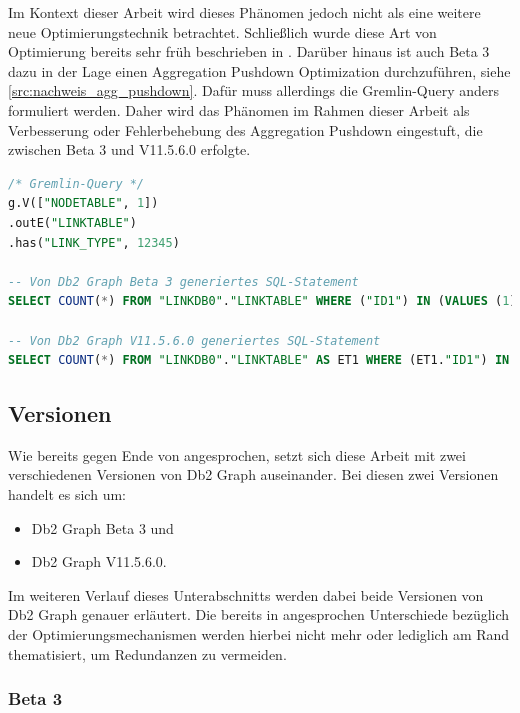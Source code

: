 \begin{itemize}
    Im Kontext dieser Arbeit wird dieses Phänomen jedoch nicht als eine weitere neue Optimierungstechnik betrachtet. Schließlich wurde diese Art von Optimierung bereits sehr früh beschrieben in \cite{sigmod_tian}. Darüber hinaus ist auch Beta 3 dazu in der Lage einen Aggregation Pushdown Optimization durchzuführen, siehe \autoref{src:nachweis_agg_pushdown}. Dafür muss allerdings die Gremlin-Query anders formuliert werden. Daher wird das Phänomen im Rahmen dieser Arbeit als Verbesserung oder Fehlerbehebung des Aggregation Pushdown eingestuft, die zwischen Beta 3 und V11.5.6.0 erfolgte.

\begin{lstlisting}[label=src:nachweis_agg_pushdown,caption={Nachweis für Aggregation Pushdown in Db2 Graph Beta 3},language=SQL]
/* Gremlin-Query */
g.V(["NODETABLE", 1])
.outE("LINKTABLE")
.has("LINK_TYPE", 12345)

-- Von Db2 Graph Beta 3 generiertes SQL-Statement
SELECT COUNT(*) FROM "LINKDB0"."LINKTABLE" WHERE ("ID1") IN (VALUES (1)) AND "LINK_TYPE" = 12345;

-- Von Db2 Graph V11.5.6.0 generiertes SQL-Statement
SELECT COUNT(*) FROM "LINKDB0"."LINKTABLE" AS ET1 WHERE (ET1."ID1") IN (VALUES (1)) AND ET1."LINK_TYPE" = 12345;
\end{lstlisting}
\end{itemize}

\subsection{Versionen}
\label{db2graph:versionen}

Wie bereits gegen Ende von  angesprochen, setzt sich diese Arbeit mit zwei verschiedenen Versionen von Db2 Graph auseinander. Bei diesen zwei Versionen handelt es sich um: 

\begin{itemize}
    \item Db2 Graph Beta 3 und
    \item Db2 Graph V11.5.6.0.
\end{itemize}

Im weiteren Verlauf dieses Unterabschnitts werden dabei beide Versionen von Db2 Graph genauer erläutert. Die bereits in  angesprochen Unterschiede bezüglich der Optimierungsmechanismen werden hierbei nicht mehr oder lediglich am Rand thematisiert, um Redundanzen zu vermeiden. 

\subsubsection{Beta 3}

